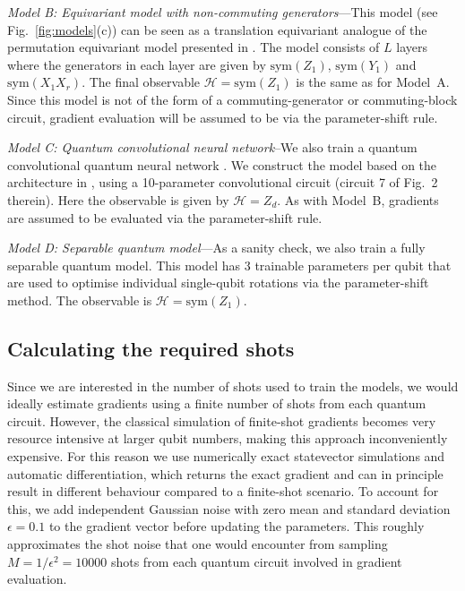 \documentclass[a4paper,twocolumn,11pt]{quantumarticle}
\begin{document}
\emph{Model B: Equivariant model with non-commuting generators}---This model (see Fig.\ \ref{fig:models}(c)) can be seen as a translation equivariant analogue of the permutation equivariant model presented in \cite{schatzki2022theoretical}. The model consists of $L$ layers where the generators in each layer are given by $\text{sym}(Z_1)$, $\text{sym}(Y_1)$ and $\text{sym}(X_1X_{r})$. The final observable $\mathcal{H}=\text{sym}(Z_1)$ is the same as for Model~A. Since this model is not of the form of a commuting-generator or commuting-block circuit, gradient evaluation will be assumed to be via the parameter-shift rule.  

\emph{Model C: Quantum convolutional neural network}--We also train a quantum convolutional quantum neural network \cite{qconv,hur2022quantum}. We construct the model based on the architecture in \cite{hur2022quantum}, using a 10-parameter convolutional circuit (circuit 7 of Fig.\ 2 therein). Here the observable is given by $\mathcal{H}=Z_d$. As with Model~B, gradients are assumed to be evaluated via the parameter-shift rule. 

\emph{Model D: Separable quantum model}---As a sanity check, we also train a fully separable quantum model. This model has $3$ trainable parameters per qubit that are used to optimise individual single-qubit rotations via the parameter-shift method. The observable is $\mathcal{H}=\text{sym}(Z_1)$.


\subsection{Calculating the required shots}\label{sec:modelshots}
Since we are interested in the number of shots used to train the models, we would ideally estimate gradients using a finite number of shots from each quantum circuit. 
However, the classical simulation of finite-shot gradients becomes very resource intensive at larger qubit numbers, making this approach inconveniently expensive.
For this reason we use numerically exact statevector simulations and automatic differentiation, which returns the exact gradient and can in principle result in different behaviour compared to a finite-shot scenario. To account for this, we add independent Gaussian noise with zero mean and standard deviation $\epsilon= 0.1$ to the gradient vector before updating the parameters. This roughly approximates the shot noise that one would encounter from sampling $M=1/\epsilon^2=10000$ shots from each quantum circuit involved in gradient evaluation. 
\end{document}
